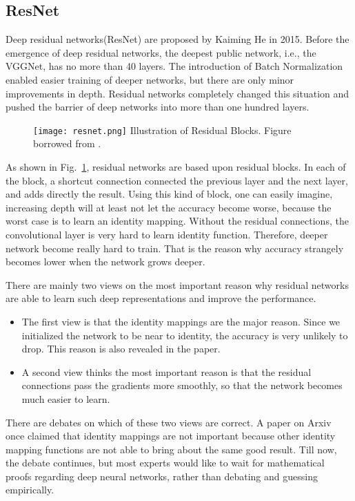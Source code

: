 \subsection{ResNet}
Deep residual networks\cite{he2016deep}(ResNet) are proposed by Kaiming He in 2015. Before the emergence of deep residual networks, the deepest public network, i.e., the VGGNet, has no more than 40 layers. The introduction of Batch Normalization enabled easier training of deeper networks, but there are only minor improvements in depth. Residual networks completely changed this situation and pushed the barrier of deep networks into more than one hundred layers. 
\begin{figure}[!htp]
	\centering
	\texttt{[image: resnet.png]}
	{Illustration of Residual Blocks. Figure borrowed from \cite{he2016deep}.}
	\label{fig:resnet}
\end{figure}

As shown in Fig.~\ref{fig:resnet}, residual networks are based upon residual blocks. In each of the block, a shortcut connection connected the previous layer and the next layer, and adds directly the result. Using this kind of block, one can easily imagine, increasing depth will at least not let the accuracy become worse, because the worst case is to learn an identity mapping. Without the residual connections, the convolutional layer is very hard to learn identity function. Therefore, deeper network become really hard to train. That is the reason why accuracy strangely becomes lower when the network grows deeper. 

There are mainly two views on the most important reason why residual networks are able to learn such deep representations and improve the performance.
\begin{itemize}
	\item The first view is that the identity mappings are the major reason. Since we initialized the network to be near to identity, the accuracy is very unlikely to drop. This reason is also revealed in the paper.
	\item A second view thinks the most important reason is that the residual connections pass the gradients more smoothly, so that the network becomes much easier to learn.
\end{itemize}
There are debates on which of these two views are correct. A paper on Arxiv once claimed that identity mappings are not important because other identity mapping functions are not able to bring about the same good result. Till now, the debate continues, but most experts would like to wait for mathematical proofs regarding deep neural networks, rather than debating and guessing empirically. 

